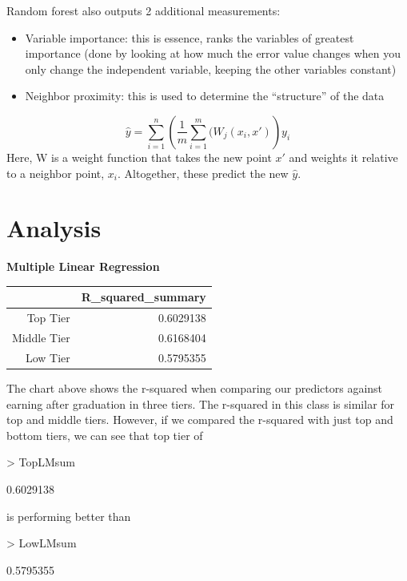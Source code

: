 \documentclass{article}
\begin{document}
Random forest also outputs 2 additional measurements:
\begin{itemize}
\item Variable importance: this is essence, ranks the variables of greatest importance (done by looking at how much the error value changes when you only change the independent variable, keeping the other variables constant)
\item Neighbor proximity: this is used to determine the ``structure'' of the data
\end{itemize}

$$\hat y =  \sum_{i=1}^{n} \left(\frac{1}{m} \sum_{i=1}^{m} (W_j(x_i,x')\right)y_i$$
Here, W is a weight function that takes the new point $x'$ and weights it relative to a neighbor point, $x_i$.  Altogether, these predict the new $\hat y$.



\section{Analysis}

\noindent \textbf{Multiple Linear Regression}\newline
\begin{table}[ht]
\centering
\begin{tabular}{rr}
  \hline
 & R\_squared\_summary \\ 
  \hline
Top Tier & 0.6029138 \\ 
  Middle Tier & 0.6168404 \\ 
  Low Tier & 0.5795355 \\ 
   \hline
\end{tabular}
\end{table}\newline
\indent The chart above shows the r-squared when comparing our predictors against earning after graduation in three tiers. The r-squared in this class is similar for top and middle tiers.  However, if we compared the r-squared with just top and bottom tiers, we can see that top tier of 
\begin{Schunk}
\begin{Sinput}
> TopLMsum
\end{Sinput}
\begin{Soutput}
[1] 0.6029138
\end{Soutput}
\end{Schunk}
is performing better than 
\begin{Schunk}
\begin{Sinput}
> LowLMsum
\end{Sinput}
\begin{Soutput}
[1] 0.5795355
\end{Soutput}
\end{Schunk}
\end{document}
